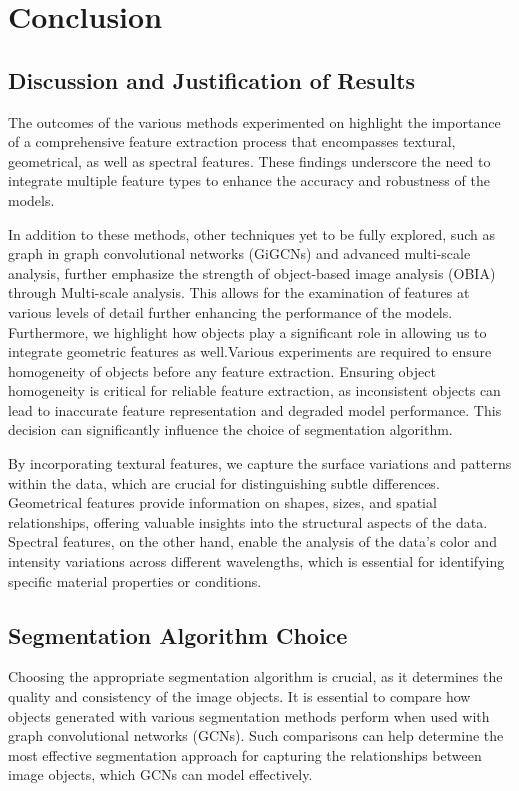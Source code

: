 \chapter{Conclusion}
\section{Discussion and Justification of Results}
The outcomes of the various methods experimented on highlight the importance of a comprehensive feature extraction process that encompasses textural, geometrical, as well as spectral features. These findings underscore the need to integrate multiple feature types to enhance the accuracy and robustness of the models.


In addition to these methods, other techniques yet to be fully explored, such as graph in graph \cite{jia_graph--graph_2024}convolutional networks (GiGCNs) and advanced multi-scale analysis, further emphasize the strength of object-based image analysis (OBIA) through Multi-scale analysis. This allows for the examination of features at various levels of detail further enhancing the performance of the models. Furthermore, we highlight how objects play a significant role in allowing us to integrate geometric features as well.Various experiments are required to ensure homogeneity of objects before any feature extraction. Ensuring object homogeneity is critical for reliable feature extraction, as inconsistent objects can lead to inaccurate feature representation and degraded model performance. This decision can significantly influence the choice of segmentation algorithm.


By incorporating textural features, we capture the surface variations and patterns within the data, which are crucial for distinguishing subtle differences. Geometrical features provide information on shapes, sizes, and spatial relationships, offering valuable insights into the structural aspects of the data. Spectral features, on the other hand, enable the analysis of the data's color and intensity variations across different wavelengths, which is essential for identifying specific material properties or conditions.

\section{Segmentation Algorithm Choice}

Choosing the appropriate segmentation algorithm is crucial, as it determines the quality and consistency of the image objects. It is essential to compare how objects generated with various segmentation methods perform when used with graph convolutional networks (GCNs). Such comparisons can help determine the most effective segmentation approach for capturing the relationships between image objects, which GCNs can model effectively.

